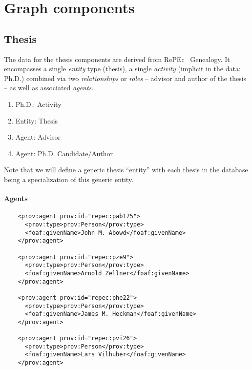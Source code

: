 \documentclass[x11names]{article}
\newcommand{\repec}{RePEc}
\begin{document}
\providecommand{\cmark}[2][]{\relax} 
%
\section{Graph components}

\subsection{Thesis}
The data for the thesis components are derived from \repec~ Genealogy. It encompasses a single \emph{entity} type (thesis), a single \emph{activity} (implicit in the data: Ph.D.) combined via two \emph{relationships} or \emph{roles} -- advisor and author of the thesis -- as well as associated \emph{agents}.
\begin{enumerate}
\item Ph.D.: Activity
\item Entity: Thesis
\item Agent: Advisor
\item Agent: Ph.D. Candidate/Author
\end{enumerate}
Note that we will define a generic thesis ``entity'' with each thesis in the database being a specialization of this generic entity. 
\paragraph{Agents}
\lstset{language=XML,breaklines=true}
\begin{lstlisting}
    <prov:agent prov:id="repec:pab175">
      <prov:type>prov:Person</prov:type>
      <foaf:givenName>John M. Abowd</foaf:givenName>
    </prov:agent>

    <prov:agent prov:id="repec:pze9">
      <prov:type>prov:Person</prov:type>
      <foaf:givenName>Arnold Zellner</foaf:givenName>
    </prov:agent>

    <prov:agent prov:id="repec:phe22">
      <prov:type>prov:Person</prov:type>
      <foaf:givenName>James M. Heckman</foaf:givenName>
    </prov:agent>

    <prov:agent prov:id="repec:pvi26">
      <prov:type>prov:Person</prov:type>
      <foaf:givenName>Lars Vilhuber</foaf:givenName>
    </prov:agent>
\end{lstlisting}
\end{document}
